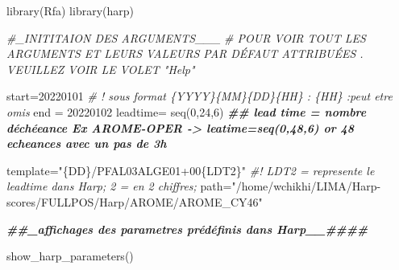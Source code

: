 \documentclass[
]{article}
\newenvironment{Shaded}{\begin{snugshade}}{\end{snugshade}}
\newcommand{\CommentTok}[1]{\textcolor[rgb]{0.56,0.35,0.01}{\textit{#1}}}
\newcommand{\DecValTok}[1]{\textcolor[rgb]{0.00,0.00,0.81}{#1}}
\newcommand{\DocumentationTok}[1]{\textcolor[rgb]{0.56,0.35,0.01}{\textbf{\textit{#1}}}}
\newcommand{\FunctionTok}[1]{\textcolor[rgb]{0.00,0.00,0.00}{#1}}
\newcommand{\NormalTok}[1]{#1}
\newcommand{\OtherTok}[1]{\textcolor[rgb]{0.56,0.35,0.01}{#1}}
\newcommand{\StringTok}[1]{\textcolor[rgb]{0.31,0.60,0.02}{#1}}
\begin{document}
\begin{Shaded}
\begin{Highlighting}[]
\FunctionTok{library}\NormalTok{(Rfa)}
\FunctionTok{library}\NormalTok{(harp)}

\CommentTok{\#\_INITITAION DES ARGUMENTS\_\_\_ }
\CommentTok{\# POUR VOIR TOUT LES ARGUMENTS ET LEURS VALEURS PAR DÉFAUT ATTRIBUÉES . VEUILLEZ VOIR LE VOLET "Help" }


\NormalTok{start}\OtherTok{=}\DecValTok{20220101}          \CommentTok{\# ! sous format \{YYYY\}\{MM\}\{DD\}\{HH\} : \{HH\} :peut etre omis}
\NormalTok{end }\OtherTok{=} \DecValTok{20220102}
\NormalTok{leadtime}\OtherTok{=} \FunctionTok{seq}\NormalTok{(}\DecValTok{0}\NormalTok{,}\DecValTok{24}\NormalTok{,}\DecValTok{6}\NormalTok{)   }\DocumentationTok{\#\# lead time = nombre d\textquotesingle{}échéeance Ex AROME{-}OPER {-}\textgreater{} leatime=seq(0,48,6) or 48 echeances avec un pas de 3h }

\NormalTok{template}\OtherTok{=}\StringTok{"\{DD\}/PFAL03ALGE01+00\{LDT2\}"} \CommentTok{\#! LDT2 = represente le leadtime dans Harp; 2 = en 2 chiffres;  }
\NormalTok{path}\OtherTok{=}\StringTok{"/home/wchikhi/LIMA/Harp{-}scores/FULLPOS/Harp/AROME/AROME\_CY46"}

\DocumentationTok{\#\#\_affichages des parametres prédéfinis dans Harp\_\_\#\#\#\#}

\FunctionTok{show\_harp\_parameters}\NormalTok{()}
\end{Highlighting}
\end{Shaded}
\end{document}
